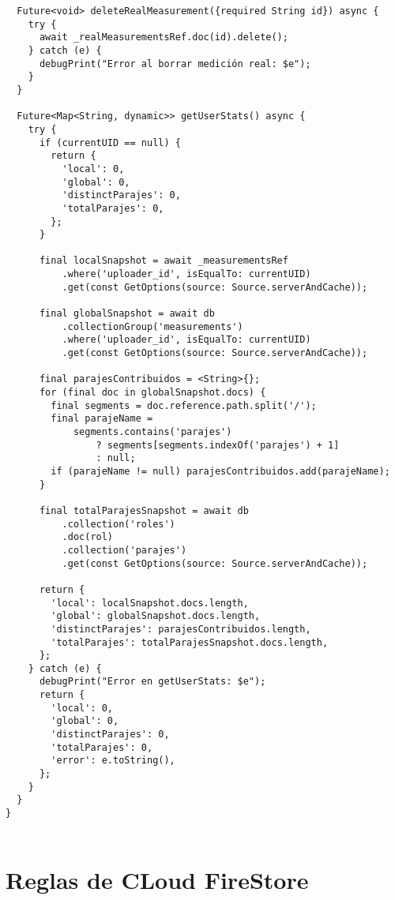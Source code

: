 \begin{verbatim}
  Future<void> deleteRealMeasurement({required String id}) async {
    try {
      await _realMeasurementsRef.doc(id).delete(); 
    } catch (e) {
      debugPrint("Error al borrar medición real: $e");
    }
  }

  Future<Map<String, dynamic>> getUserStats() async {
    try {
      if (currentUID == null) {
        return {
          'local': 0,
          'global': 0,
          'distinctParajes': 0,
          'totalParajes': 0,
        };
      }

      final localSnapshot = await _measurementsRef
          .where('uploader_id', isEqualTo: currentUID)
          .get(const GetOptions(source: Source.serverAndCache));

      final globalSnapshot = await db
          .collectionGroup('measurements')
          .where('uploader_id', isEqualTo: currentUID)
          .get(const GetOptions(source: Source.serverAndCache));

      final parajesContribuidos = <String>{};
      for (final doc in globalSnapshot.docs) {
        final segments = doc.reference.path.split('/');
        final parajeName =
            segments.contains('parajes')
                ? segments[segments.indexOf('parajes') + 1]
                : null;
        if (parajeName != null) parajesContribuidos.add(parajeName);
      }

      final totalParajesSnapshot = await db
          .collection('roles')
          .doc(rol)
          .collection('parajes')
          .get(const GetOptions(source: Source.serverAndCache));

      return {
        'local': localSnapshot.docs.length,
        'global': globalSnapshot.docs.length,
        'distinctParajes': parajesContribuidos.length,
        'totalParajes': totalParajesSnapshot.docs.length,
      };
    } catch (e) {
      debugPrint("Error en getUserStats: $e");
      return {
        'local': 0,
        'global': 0,
        'distinctParajes': 0,
        'totalParajes': 0,
        'error': e.toString(),
      };
    }
  }
}


        \end{verbatim}


\newpage
\section{Reglas de CLoud FireStore}
\label{anexo:alg2}


